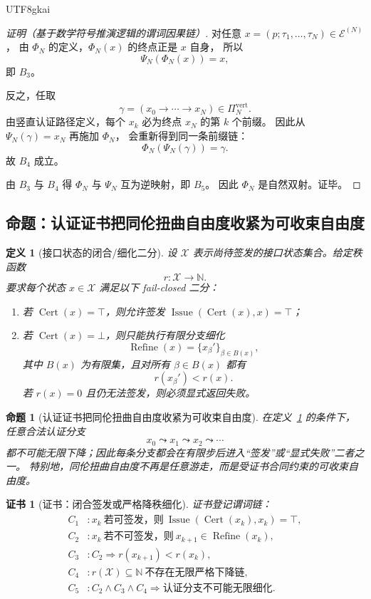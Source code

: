 \documentclass[12pt]{article}
\newtheorem{definition}{定义}[section]
\newtheorem{proposition}{命题}[section]
\newtheorem{Certificate}{证书}[section]
\newcommand{\NN}{\mathbb{N}}
\newcommand{\Cert}{\operatorname{Cert}}
\newcommand{\Refine}{\operatorname{Refine}}
\newcommand{\Issue}{\operatorname{Issue}}
\begin{document}
\begin{CJK*}{UTF8}{gkai}
\begin{proof}[证明（基于数学符号推演逻辑的谓词因果链）]
对任意 $x=(p;\tau_1,\dots,\tau_N)\in\mathcal E^{(N)}$，
由 $\Phi_N$ 的定义，$\Phi_N(x)$ 的终点正是 $x$ 自身，
所以
\[
  \Psi_N(\Phi_N(x))=x,
\]
即 $B_3$。

反之，任取
\[
  \gamma=(x_0\to\cdots\to x_N)\in \Pi_N^{\mathrm{vert}}.
\]
由竖直认证路径定义，每个 $x_k$ 必为终点 $x_N$ 的第 $k$ 个前缀。
因此从 $\Psi_N(\gamma)=x_N$ 再施加 $\Phi_N$，
会重新得到同一条前缀链：
\[
  \Phi_N(\Psi_N(\gamma))=\gamma.
\]
故 $B_4$ 成立。

由 $B_3$ 与 $B_4$ 得 $\Phi_N$ 与 $\Psi_N$ 互为逆映射，即 $B_5$。
因此 $\Phi_N$ 是自然双射。证毕。
\end{proof}

\subsection{命题：认证证书把同伦扭曲自由度收紧为可收束自由度}
\label{subsec:tex37-ch13-convergence}

\begin{definition}[接口状态的闭合/细化二分]
\label{def:tex37-ch13-refine}
设 $\mathcal X$ 表示尚待签发的接口状态集合。给定秩函数
\[
  r:\mathcal X\to \NN.
\]
要求每个状态 $x\in\mathcal X$ 满足以下 fail-closed 二分：
\begin{enumerate}
  \item 若 $\Cert(x)=\top$，则允许签发 $\Issue(\Cert(x),x)=\top$；
  \item 若 $\Cert(x)=\bot$，则只能执行有限分支细化
  \[
    \Refine(x)=\{x_\beta'\}_{\beta\in B(x)},
  \]
  其中 $B(x)$ 为有限集，且对所有 $\beta\in B(x)$ 都有
  \[
    r(x_\beta')<r(x).
  \]
  若 $r(x)=0$ 且仍无法签发，则必须显式返回失败。
\end{enumerate}
\end{definition}

\begin{proposition}[认证证书把同伦扭曲自由度收紧为可收束自由度]
\label{prop:tex37-ch13-convergence}
在定义~\ref{def:tex37-ch13-refine} 的条件下，
任意合法认证分支
\[
  x_0\leadsto x_1\leadsto x_2\leadsto \cdots
\]
都不可能无限下降；因此每条分支都会在有限步后进入“签发”或“显式失败”二者之一。
特别地，同伦扭曲自由度不再是任意游走，而是受证书合同约束的可收束自由度。
\end{proposition}

\begin{Certificate}[证书：闭合签发或严格降秩细化]
\label{cert:tex37-ch13-convergence}
证书登记谓词链：
\[
\begin{aligned}
  C_1 &: x_k\ \text{若可签发，则}\ \Issue(\Cert(x_k),x_k)=\top,\\
  C_2 &: x_k\ \text{若不可签发，则}\ x_{k+1}\in \Refine(x_k),\\
  C_3 &: C_2 \Rightarrow r(x_{k+1})<r(x_k),\\
  C_4 &: r(\mathcal X)\subseteq \NN\ \text{不存在无限严格下降链},\\
  C_5 &: C_2\wedge C_3\wedge C_4 \Rightarrow \text{认证分支不可能无限细化}.
\end{aligned}
\]
\end{Certificate}


\end{CJK*}
\end{document}
